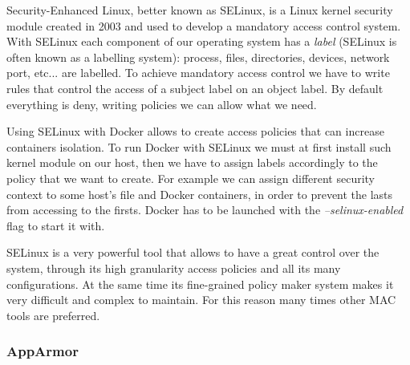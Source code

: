 \documentclass[a4paper,12pt]{article}
\begin{document}
Security-Enhanced Linux, better known as SELinux, is a Linux kernel security
module created in 2003 and used to develop a mandatory access control system.
With SELinux each component of our operating system has a \textit{label}
(SELinux is often known as a labelling system): process, files, directories,
devices, network port, etc... are labelled. To achieve mandatory access control
we have to write rules that control the access of a subject label on an object
label. By default everything is deny, writing policies we can allow what we
need. \par Using SELinux with Docker allows to create access policies that can
increase containers isolation. To run Docker with SELinux we must at first
install such kernel module on our host, then we have to assign labels
accordingly to the policy that we want to create. For example we can assign
different security context to some host's file and Docker containers, in order
to prevent the lasts from accessing to the firsts. Docker has to be launched
with the \textit{--selinux-enabled} flag to start it with. \par SELinux is a
very powerful tool that allows to have a great control over the system, through
its high granularity access policies and all its many configurations. At the
same time its fine-grained policy maker system makes it very difficult and
complex to maintain. For this reason many times other MAC tools are preferred.

\subsubsection{AppArmor}
\end{document}
